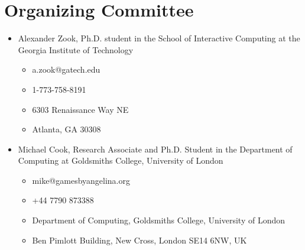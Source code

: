 \documentclass[10pt,a4paper]{article}
\begin{document}
\section{Organizing Committee}
\begin{itemize}
\itemsep0em
\item Alexander Zook, Ph.D. student in the School of Interactive Computing at the Georgia Institute of Technology
\begin{itemize}
\itemsep0em
\item a.zook@gatech.edu
\item 1-773-758-8191
\item 6303 Renaissance Way NE
\item Atlanta, GA 30308
\end{itemize}
\item Michael Cook, Research Associate and Ph.D. Student in the Department of Computing at Goldsmiths College, University of London
\begin{itemize}
\itemsep0em
\item mike@gamesbyangelina.org
\item +44 7790 873388
\item Department of Computing, Goldsmiths College, University of London
\item Ben Pimlott Building, New Cross, London SE14 6NW, UK
\end{itemize}
\end{itemize}
\end{document}
